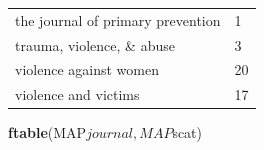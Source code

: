 \documentclass[]{tufte-handout}
\newenvironment{Shaded}{}{}
\newcommand{\KeywordTok}[1]{\textbf{{#1}}}
\newcommand{\NormalTok}[1]{{#1}}
\begin{document}
\begin{longtable}[]{@{}ll@{}}
\begin{minipage}[t]{0.67\columnwidth}
the journal of primary prevention\strut
\end{minipage} & \begin{minipage}[t]{0.08\columnwidth}\raggedright\strut
1\strut
\end{minipage}\tabularnewline
\begin{minipage}[t]{0.67\columnwidth}\raggedright\strut
trauma, violence, \& abuse\strut
\end{minipage} & \begin{minipage}[t]{0.08\columnwidth}\raggedright\strut
3\strut
\end{minipage}\tabularnewline
\begin{minipage}[t]{0.67\columnwidth}\raggedright\strut
violence against women\strut
\end{minipage} & \begin{minipage}[t]{0.08\columnwidth}\raggedright\strut
20\strut
\end{minipage}\tabularnewline
\begin{minipage}[t]{0.67\columnwidth}\raggedright\strut
violence and victims\strut
\end{minipage} & \begin{minipage}[t]{0.08\columnwidth}\raggedright\strut
17\strut
\end{minipage}\tabularnewline
\bottomrule
\end{longtable}

\begin{Shaded}
\begin{Highlighting}[]
\KeywordTok{ftable}\NormalTok{(MAP$journal, MAP$scat)}
\end{Highlighting}
\end{Shaded}
\end{document}
